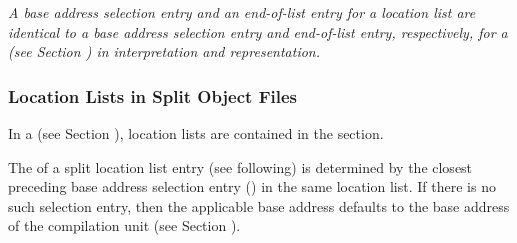 \textit{A base address selection entry and an end-of-list
entry for a location list are identical to a base address
selection entry and end-of-list entry, respectively, for a
(see Section ) 
in interpretation and representation.}

\subsubsection{Location Lists in Split Object Files}
\label{chap:locationlistsinsplitobjectfiles}
In a \splitDWARFobjectfile{} (see 
Section ), 
location lists are contained in the \dotdebuglocdwo{} section.

The  of a split
location list entry (see following) is
determined by the closest preceding base address selection
entry (\DWLLEbaseaddressselectionentry) in the same location list. If there is
no such selection entry, then the applicable base address
defaults to the base address of the compilation unit (see
Section ).

